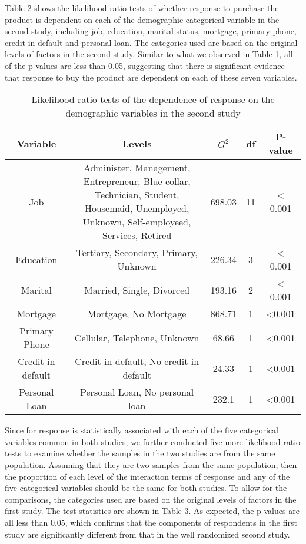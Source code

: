 \documentclass[]{article}
\begin{document}
Table 2 shows the likelihood ratio tests of whether response to purchase
the product is dependent on each of the demographic categorical variable
in the second study, including job, education, marital status, mortgage,
primary phone, credit in default and personal loan. The categories used
are based on the original levels of factors in the second study. Similar
to what we observed in Table 1, all of the p-values are less than 0.05,
suggesting that there is significant evidence that response to buy the
product are dependent on each of these seven variables.

\begin{table}[h!]
    \centering
    \begin{tabular}{ |c | c | c | c | c |}
    \hline
        Variable & Levels & \(G^2\) & df & P-value \\ \hline
        Job & \shortstack{Administer, Management, Entrepreneur, Blue-collar, \\  Technician, Student, Housemaid, Unemployed, \\ Unknown, Self-employeed, Services, Retired} & 698.03 & 11 & < 0.001 \\ \hline
        Education & Tertiary, Secondary, Primary,  Unknown & 226.34 & 3 & < 0.001 \\ \hline
        Marital & Married, Single, Divorced & 193.16 & 2 & < 0.001 \\ \hline
        Mortgage & Mortgage, No Mortgage & 868.71 & 1 & <0.001 \\ \hline
        Primary Phone & Cellular, Telephone, Unknown & 68.66 & 1 & <0.001 \\ \hline
        Credit in default & Credit in default, No credit in default & 24.33 & 1 & <0.001 \\ \hline
        Personal Loan & Personal Loan, No personal loan  & 232.1 & 1 & <0.001 \\ \hline
    \end{tabular}
    \caption{Likelihood ratio tests of the dependence of response on the demographic variables in the second study}
\end{table}

Since for response is statistically associated with each of the five
categorical variables common in both studies, we further conducted five
more likelihood ratio tests to examine whether the samples in the two
studies are from the same population. Assuming that they are two samples
from the same population, then the proportion of each level of the
interaction terms of response and any of the five categorical variables
should be the same for both studies. To allow for the comparisons, the
categories used are based on the original levels of factors in the first
study. The test statistics are shown in Table 3. As expected, the
p-values are all less than 0.05, which confirms that the components of
respondents in the first study are significantly different from that in
the well randomized second study.
\end{document}

